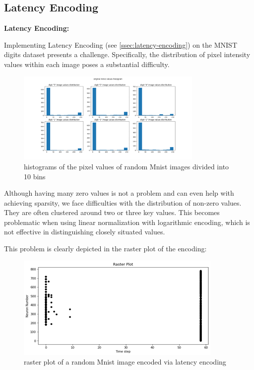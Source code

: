 \subsection{Latency Encoding}

\textbf{Latency Encoding:}

Implementing Latency Encoding (see \ref{ssec:latency-encoding}) on the MNIST digits dataset presents a challenge. Specifically, the distribution of pixel intensity values within each image poses a substantial difficulty.

\begin{figure}[H]
    \centering
    \includegraphics[width=0.8\textwidth]{methods/spike-encoding/graphs/mnist-values-histogram.png}
    \caption{histograms of the pixel values of random Mnist images divided into 10 bins}
    \label{fig:mnist-values-histogram}
\end{figure}

Although having many zero values is not a problem and can even help with achieving sparsity, we face difficulties with the distribution of non-zero values. They are often clustered around two or three key values. This becomes problematic when using linear normalization with logarithmic encoding, which is not effective in distinguishing closely situated values.

This problem is clearly depicted in the raster plot of the encoding:


\begin{figure}[H]
    \centering
    \includegraphics[width=0.8\linewidth]{methods/spike-encoding/graphs/latency-encoding-raster.png}
    \caption{raster plot of a random Mnist image encoded via latency encoding}
    \label{fig:latency-encoding-raster}
\end{figure}

